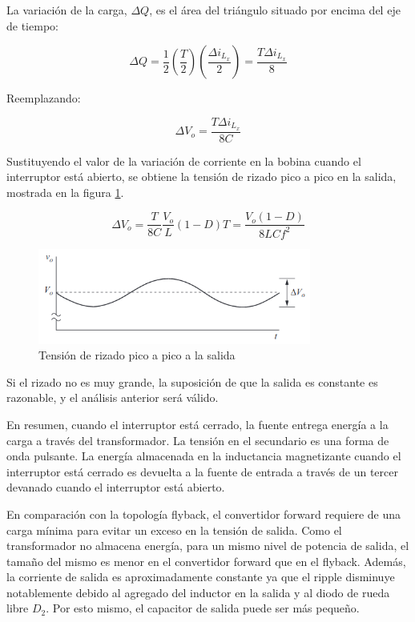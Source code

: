 La variación de la carga, $\Delta Q$, es el área del triángulo situado por encima del eje de tiempo:

$$ \Delta Q=\frac{1}{2}\left(\frac{T}{2}\right)\left(\frac{\Delta i_{L_x}}{2}\right)=\frac{T\Delta i_{L_x}}{8} $$

Reemplazando:

$$ \Delta V_o=\frac{T\Delta i_{L_x}}{8C} $$

Sustituyendo el valor de la variación de corriente en la bobina cuando el interruptor está abierto, 
se obtiene la tensión de rizado pico a pico en la salida, mostrada en la figura \ref{fig:buck_converter_capacitor_ripple_voltage}.

$$ \Delta V_o=\frac{T}{8C}\frac{V_o}{L}(1-D)T=\frac{V_o(1-D)}{8LCf^2} $$

\begin{figure}[ht]
    \centering
    \includegraphics[width=0.8\textwidth]{../images/hart/buck_converter_capacitor_ripple_voltage.png}
    \caption{Tensión de rizado pico a pico a la salida}
    \label{fig:buck_converter_capacitor_ripple_voltage}
\end{figure}

Si el rizado no es muy grande, la suposición de que la salida es constante es razonable, y el
análisis anterior será válido.

En resumen, cuando el interruptor está cerrado, la fuente entrega energía a la carga a través del transformador.
La tensión en el secundario es una forma de onda pulsante. La energía almacenada en
la inductancia magnetizante cuando el interruptor está cerrado es devuelta a la fuente de
entrada a través de un tercer devanado cuando el interruptor está abierto.

En comparación con la topología flyback, el convertidor forward requiere de una carga mínima para evitar un exceso en la tensión de salida. 
Como el transformador no almacena energía, para un mismo nivel de potencia de salida, 
el tamaño del mismo es menor en el convertidor forward que en el flyback. 
Además, la corriente de salida es aproximadamente constante ya que el ripple disminuye notablemente 
debido al agregado del inductor en la salida y al diodo de rueda libre $D_2$.
Por esto mismo, el capacitor de salida puede ser más pequeño. 


